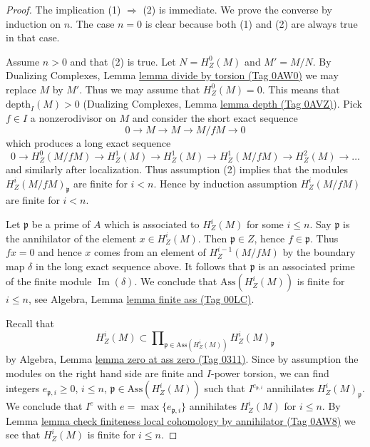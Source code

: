 \documentclass{amsart}
\theoremstyle{plain}
\theoremstyle{definition}
\theoremstyle{remark}
\numberwithin{equation}{subsection}
\def\Im{\mathop{\mathrm{Im}}}
\begin{document}
\begin{proof}
The implication (1) $\Rightarrow$ (2) is immediate. We prove the converse
by induction on $n$. The case $n = 0$ is clear because both (1) and
(2) are always true in that case.

\medskip\noindent
Assume $n > 0$ and that (2) is true. Let $N = H^0_Z(M)$ and $M' = M/N$.
By Dualizing Complexes, Lemma \href{https://stacks.math.columbia.edu/tag/0AW0}{lemma divide by torsion (Tag 0AW0)}
we may replace $M$ by $M'$.
Thus we may assume that $H^0_Z(M) = 0$.
This means that $\text{depth}_I(M) > 0$
(Dualizing Complexes, Lemma \href{https://stacks.math.columbia.edu/tag/0AVZ}{lemma depth (Tag 0AVZ)}).
Pick $f \in I$ a nonzerodivisor on $M$ and consider the short
exact sequence
$$
0 \to M \to M \to M/fM \to 0
$$
which produces a long exact sequence
$$
0 \to H^0_Z(M/fM) \to H^1_Z(M) \to H^1_Z(M) \to H^1_Z(M/fM) \to
H^2_Z(M) \to \ldots
$$
and similarly after localization. Thus assumption (2) implies that
the modules $H^i_Z(M/fM)_\mathfrak p$ are finite for $i < n$. Hence
by induction assumption $H^i_Z(M/fM)$ are finite for $i < n$.

\medskip\noindent
Let $\mathfrak p$ be a prime of $A$ which is associated to
$H^i_Z(M)$ for some $i \leq n$. Say $\mathfrak p$ is the annihilator
of the element $x \in H^i_Z(M)$. Then $\mathfrak p \in Z$, hence
$f \in \mathfrak p$. Thus $fx = 0$ and hence $x$ comes from an
element of $H^{i - 1}_Z(M/fM)$ by the boundary map $\delta$ in the long
exact sequence above. It follows that $\mathfrak p$ is an associated
prime of the finite module $\Im(\delta)$. We conclude that
$\text{Ass}(H^i_Z(M))$ is finite for $i \leq n$, see
Algebra, Lemma \href{https://stacks.math.columbia.edu/tag/00LC}{lemma finite ass (Tag 00LC)}.

\medskip\noindent
Recall that
$$
H^i_Z(M) \subset
\prod\nolimits_{\mathfrak p \in \text{Ass}(H^i_Z(M))}
H^i_Z(M)_\mathfrak p
$$
by Algebra, Lemma \href{https://stacks.math.columbia.edu/tag/0311}{lemma zero at ass zero (Tag 0311)}. Since by
assumption the modules on the right hand side are finite and $I$-power
torsion, we can find integers $e_{\mathfrak p, i} \geq 0$, $i \leq n$,
$\mathfrak p \in \text{Ass}(H^i_Z(M))$ such that
$I^{e_{\mathfrak p, i}}$ annihilates $H^i_Z(M)_\mathfrak p$. We conclude
that $I^e$ with $e = \max\{e_{\mathfrak p, i}\}$ annihilates $H^i_Z(M)$
for $i \leq n$. By
Lemma \href{https://stacks.math.columbia.edu/tag/0AW8}{lemma check finiteness local cohomology by annihilator (Tag 0AW8)}
we see that $H^i_Z(M)$ is finite for $i \leq n$.
\end{proof}
\end{document}
